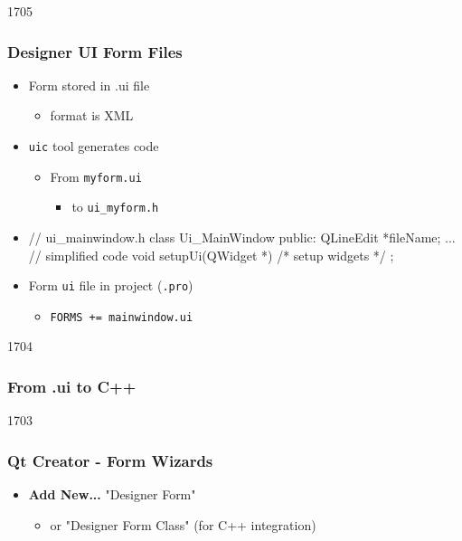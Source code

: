 \begin{slide}[fragile]{1705}
  \frametitle{Designer UI Form Files}
\begin{itemize}
\item Form stored in .ui file
  \begin{itemize}
  \item format is XML 
  \end{itemize}
\end{itemize}
\begin{itemize}
\item \texttt{uic} tool generates code
  \begin{itemize}
  \item From \texttt{myform.ui}
    \begin{itemize}
    \item to \texttt{ui\_myform.h}
    \end{itemize}
  \end{itemize}
 \item[] \begin{cpp}
// ui_mainwindow.h
class Ui_MainWindow {
public:
  QLineEdit *fileName;
  ... // simplified code
  void setupUi(QWidget *) { /* setup widgets */ }
};        
  \end{cpp}
\item Form \texttt{ui} file in project (\texttt{.pro})
  \begin{itemize}
  \item \texttt{FORMS += mainwindow.ui}
  \end{itemize}
\end{itemize}
\end{slide}

\begin{slide}[fragile]{1704}
\frametitle{From .ui to C++}
\end{slide}

\begin{slide}[fragile]{1703}
\frametitle{Qt Creator - Form Wizards}
\begin{itemize}
\item \textbf{Add New...} "Designer Form"
  \begin{itemize}
  \item or "Designer Form Class" (for C++ integration)
  \end{itemize}
\end{itemize}
\medskip
{}
\end{slide}

